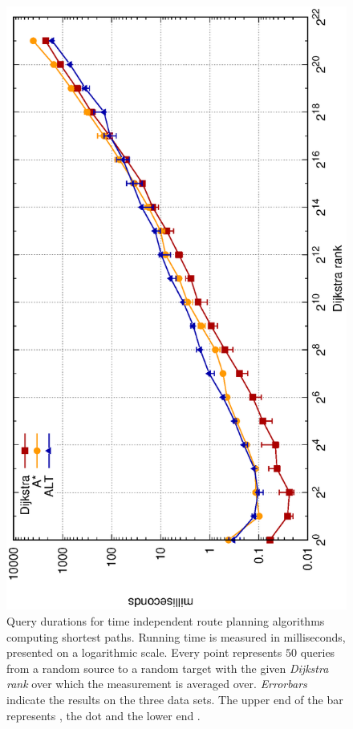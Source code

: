 	\begin{figure}[!ht]
		 \begin{center}
			\includegraphics[scale=0.55,angle=-90]{res/plots/uniModalTimeIndependentResults}
		\end{center}
		\caption{Query durations for \uniModal time independent route planning algorithms computing shortest paths.
			Running time is measured in milliseconds, presented on a logarithmic scale.
			Every point represents $50$ queries from a random source to a random target with the given \textit{Dijkstra rank}
			over which the measurement is averaged over. \textit{Errorbars} indicate the results on the three data sets.
			The upper end of the bar represents \switzerlandR, the dot \stuttgartR and the lower end \freiburgR.}
		\label{uniModalTimeIndependentResults}
	\end{figure}\quad\\
